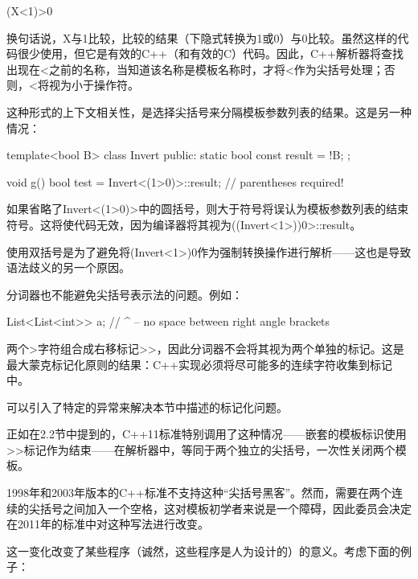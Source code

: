 \begin{cpp}
(X<1)>0
\end{cpp}

换句话说，X与1比较，比较的结果（下隐式转换为1或0）与0比较。虽然这样的代码很少使用，但它是有效的C++（和有效的C）代码。因此，C++解析器将查找出现在<之前的名称，当知道该名称是模板名称时，才将<作为尖括号处理；否则，<将视为小于操作符。

这种形式的上下文相关性，是选择尖括号来分隔模板参数列表的结果。这是另一种情况：

\begin{cpp}
template<bool B>
class Invert {
public:
	static bool const result = !B;
};

void g() {
	bool test = Invert<(1>0)>::result; // parentheses required!
}
\end{cpp}

如果省略了Invert<(1>0)>中的圆括号，则大于符号将误认为模板参数列表的结束符号。这将使代码无效，因为编译器将其视为((Invert<1>))0>::result。

\begin{notice}
使用双括号是为了避免将(Invert<1>)0作为强制转换操作进行解析——这也是导致语法歧义的另一个原因。
\end{notice}

分词器也不能避免尖括号表示法的问题。例如：

\begin{cpp}
List<List<int>> a;
			 // ^ -- no space between right angle brackets
\end{cpp}

两个>字符组合成右移标记>{}>，因此分词器不会将其视为两个单独的标记。这是最大蒙克标记化原则的结果：C++实现必须将尽可能多的连续字符收集到标记中。

\begin{notice}
可以引入了特定的异常来解决本节中描述的标记化问题。
\end{notice}

正如在2.2节中提到的，C++11标准特别调用了这种情况——嵌套的模板标识使用>{}>标记作为结束——在解析器中，等同于两个独立的尖括号，一次性关闭两个模板。

\begin{notice}
1998年和2003年版本的C++标准不支持这种“尖括号黑客”。然而，需要在两个连续的尖括号之间加入一个空格，这对模板初学者来说是一个障碍，因此委员会决定在2011年的标准中对这种写法进行改变。
\end{notice}

这一变化改变了某些程序（诚然，这些程序是人为设计的）的意义。考虑下面的例子：

